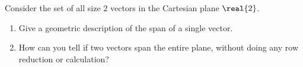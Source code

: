 Consider the set of all size $2$ vectors in the Cartesian plane $\real{2}$.
\begin{enumerate}
\item Give a geometric description of the span of a single vector.
\item How can you tell if two vectors span the entire plane, without doing any row reduction or calculation?
\end{enumerate}
